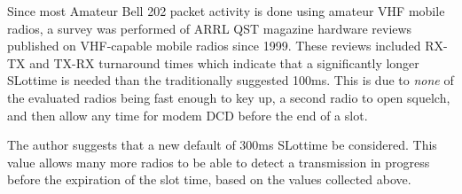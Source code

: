 Since most Amateur Bell 202 packet activity is done using amateur VHF mobile radios,
a survey was performed of ARRL QST magazine hardware reviews published on VHF-capable
mobile radios since 1999.
These reviews included RX-TX and TX-RX turnaround times
which indicate that a significantly longer SLottime is needed than the 
traditionally suggested 100ms. 
This is due to \emph{none} of the evaluated radios
being fast enough to key up, a second radio to open squelch, 
and then allow any time for modem DCD before the end of a slot.

The author suggests that a new default of 300ms SLottime be considered.
This value allows many more radios to be able to detect a transmission
in progress before the expiration of the slot time, based on the values
collected above.

